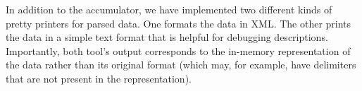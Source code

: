 In addition to the accumulator, we have implemented two different
kinds of pretty printers for parsed data.  One formats the data in
XML. The other prints the data in a simple text format that is helpful
for debugging descriptions. Importantly, both tool's output corresponds to the in-memory
representation of the data rather than its original format (which may,
for example, have delimiters that are not present in the
representation).







